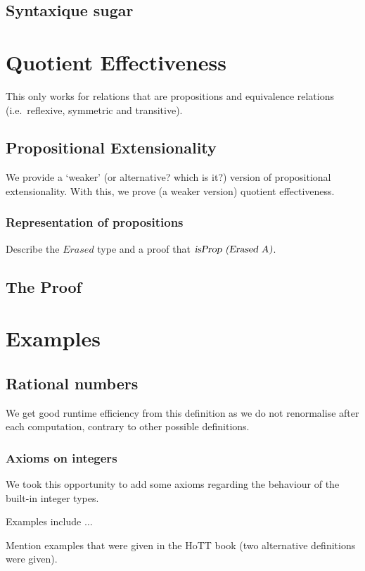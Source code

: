 \documentclass[11pt]{article}
\newcommand \id[1] {\textsl{#1}}
\begin{document}
\subsection{Syntaxique sugar}

\section{Quotient Effectiveness}
This only works for relations that are propositions and equivalence relations (i.e.\ reflexive, symmetric and transitive).
\subsection{Propositional Extensionality}
We provide a `weaker' (or alternative? which is it?) version of propositional extensionality. With this, we prove (a weaker version) quotient effectiveness.

\subsubsection{Representation of propositions}
Describe the $Erased$ type and a proof that $\id{isProp (Erased A)}$.

\subsection{The Proof}

\section{Examples}
\subsection{Rational numbers}
We get good runtime efficiency from this definition as we do not renormalise after each computation, contrary to other possible definitions.

\subsubsection{Axioms on integers}

We took this opportunity to add some axioms regarding the behaviour of the built-in integer types. 

Examples include $\ldots$

Mention examples that were given in the HoTT book (two alternative definitions were given).
\end{document}
